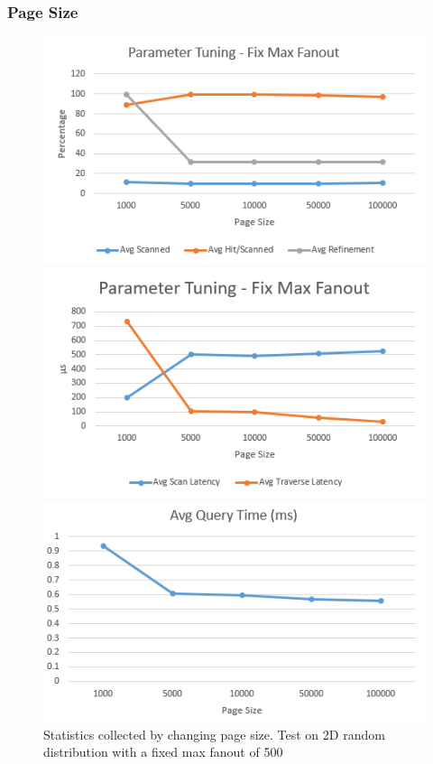 \documentclass[sigconf,10pt]{acmart}
\begin{document}
\subsubsection{Page Size}

\begin{figure}[ht] 
  \label{parameter-fix-fanout} 
  \begin{minipage}[b]{0.33\linewidth}
    \centering
    \includegraphics[width=.8\linewidth]{../figures/parameter/fix-fanout-hit} 
    \vspace{4ex}
  \end{minipage}%
  \begin{minipage}[b]{0.33\linewidth}
    \centering
    \includegraphics[width=.8\linewidth]{../figures/parameter/fix-fanout-latency} 
    \vspace{4ex}
  \end{minipage}%
  \begin{minipage}[b]{0.33\linewidth}
    \centering
    \includegraphics[width=.8\linewidth]{../figures/parameter/fix-fanout-qtime} 
    \vspace{4ex}
  \end{minipage}
  \caption{Statistics collected by changing page size. Test on 2D random distribution
  with a fixed max fanout of 500}
\end{figure}
\end{document}
